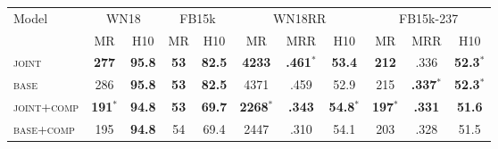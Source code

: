 \documentclass[11pt,a4paper]{article}
\begin{document}
\begin{table*}[!t]
\centering
\setlength{\tabcolsep}{5pt}
\small
\begin{tabular}{@{}lcccccccccc@{}}
\toprule
\multirow{2}{*}{Model} & \multicolumn{2}{c}{WN18} & \multicolumn{2}{c}{FB15k} & \multicolumn{3}{c}{WN18RR} & \multicolumn{3}{c}{FB15k-237} \\
\cmidrule(lr){2-3} \cmidrule(lr){4-5} \cmidrule(lr){6-8} \cmidrule(l){9-11}
 & MR & H10 & MR & H10 & MR & MRR & H10 & MR & MRR & H10 \\
\midrule
\textsc{joint} & \textbf{277} & \textbf{95.8} & \textbf{53} & \textbf{82.5} & \textbf{4233} & \textbf{.461}$^*$ & \textbf{53.4} & \textbf{212} & .336 & \textbf{52.3}$^*$ \\
\textsc{base} & 286 & \textbf{95.8} & \textbf{53} & \textbf{82.5} & 4371 & .459 & 52.9 & 215 & \textbf{.337}$^*$ & \textbf{52.3}$^*$ \\
\midrule
\textsc{joint+comp} & \textbf{191}$^*$ & \textbf{94.8} & \textbf{53} & \textbf{69.7} & \textbf{2268}$^*$ & \textbf{.343} & \textbf{54.8}$^*$ & \textbf{197}$^*$ & \textbf{.331} & \textbf{51.6} \\
\textsc{base+comp} & 195 & \textbf{94.8} & 54 & 69.4 & 2447 & .310 & 54.1 & 203 & .328 & 51.5 \\

\end{tabular}
\end{table*}
\end{document}
